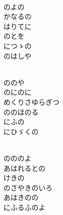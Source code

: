 \documentclass[10pt,b5j]{tarticle} %
\begin{document}
\vspace{1.5em} %
\newcommand{\linespace}{0.5em} %
\newcommand{\blocksize}{0.5\hsize} %
\newcommand{\itemmargin}{3em} %
\begin{enumerate} %
    \setlength{\itemindent}{\itemmargin} %
    \begin{minipage}[c]{\blocksize}
    
        \vspace{\linespace}
        \item~\\
        のよの\\
        かなるの\\
        はりてに\\
        のとを\\
        につゝの\\
        のはしや
        
    \end{minipage}
    \begin{minipage}[c]{\blocksize}
        
        \vspace{\linespace}
        \item~\\
        ののや\\
        のにのに\\
        めくりさゆらぎつ\\
        ののほのる\\
        にふの\\
        にひゞくの
        
    \end{minipage}
    \begin{minipage}[c]{\blocksize}
        
        \vspace{\linespace}
        \item~\\
        のののよ\\
        あはれるとの\\
        けきの\\
        のさやきのいろ\\
        あはきのの\\
        にふるふのよ
        

\end{minipage}
\end{enumerate}
\end{document}

